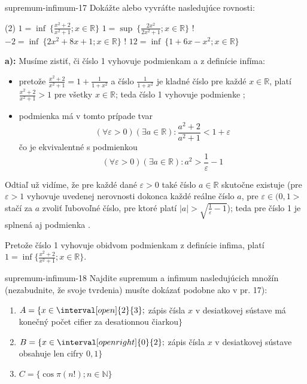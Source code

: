 \begin{defproblem}{supremum-infimum-17}
Dokážte alebo vyvráťte nasledujúce rovnosti:
\begin{tasks}(2)
  \task $1 = \inf \: \{ \frac{x^2 + 2}{x^2 + 1}; x \in \mathbb{R} \}$
  \task $1 = \sup \: \{ \frac{2x^2}{2x^2 + 1}; x \in \mathbb{R} \}$
  \task! $-2 = \inf \: \{ 2x^2 + 8x + 1; x \in \mathbb{R} \}$
  \task! $12 = \inf \: \{ 1 + 6x - x^2; x \in \mathbb{R} \}$
\end{tasks}

\begin{solution}
  \textbf{a):} Musíme zistiť, či číslo 1 vyhovuje podmienkam  a
   z definície infíma:

  \begin{itemize}
    \item[\ding{34}] pretože $\frac{x^2 + 2}{x^2 + 1} = 1 + \frac{1}{1 + x^2}$ a číslo
        $\frac{1}{1 + x^2}$ je kladné číslo pre každé $x \in \mathbb{R}$, platí
        $\frac{x^2 + 2}{x^2 + 1} > 1$ pre všetky $x \in \mathbb{R}$; teda číslo
        1 vyhovuje podmienke ;
    \item[\ding{37}] podmienka má v tomto prípade tvar
          $$(\forall \varepsilon > 0) (\exists a \in \mathbb{R}):
            \frac{a^2 + 2}{a^2 + 1} < 1 + \varepsilon$$
          čo je ekvivalentné s podmienkou
          $$(\forall \varepsilon > 0) (\exists a \in \mathbb{R}):
            a^2 > \frac{1}{\varepsilon} - 1$$
  \end{itemize}

  Odtiaľ už vidíme, že pre každé dané $\varepsilon > 0$ také číslo
  $a \in \mathbb{R}$ skutočne existuje (pre $\varepsilon > 1$ vyhovuje
  uvedenej nerovnosti dokonca každé reálne číslo $a$, pre
  $\varepsilon \in (0, 1>$ stačí za $a$ zvoliť ľubovoľné číslo, pre ktoré
  platí $|a| > \sqrt{\frac{1}{\varepsilon} - 1}$); teda pre číslo 1 je splnená
  aj podmienka .

  Pretože číslo 1 vyhovuje obidvom podmienkam z definície infima, platí
  $1 = \inf \{ \frac{x^2 + 2}{x^2 + 1}; x \in \mathbb{R} \}$.
\end{solution}
\end{defproblem}

\begin{defproblem}{supremum-infimum-18}
Najdite supremum a infimum nasledujúcich množín (nezabudnite, že svoje tvrdenia)
musíte dokázať podobne ako v pr. 17):

\begin{enumerate}[label=\arabic*.]
  \item $A = \{ x \in \interval[open]{2}{3};$ zápis čísla $x$ v desiatkovej
        sústave má konečný počet cifier za desationnou čiarkou$\}$
  \item $B = \{ x \in \interval[open right]{0}{2};$ zápis čísla $x$ v
        desiatkovej sústave obsahuje len cifry $0, 1 \}$
  \item $C = \{ \cos \pi(n!); n \in \mathbb{N} \}$
\end{enumerate}
\end{defproblem}

